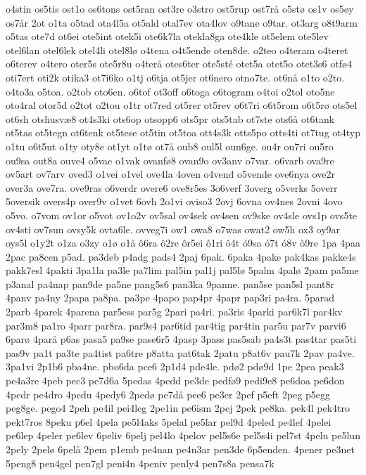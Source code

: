 {o4stin
os5tis
ost1o
os6tons
ost5ran
ost3re
o3stro
ost5rup
ost7rå
o5stø
os1v
os5øy
os7år
2ot
o1ta
o5tad
ota4l5a
ot5ald
otal7ev
ota4lov
o9tane
o9tar.
ot3arg
o8t9arm
o5tas
ote7d
ot6ei
ote5int
otek5i
ote6k7la
otekla8ga
ote4kle
ot5elem
ote5lev
otel6lan
otel6lek
otel4li
otel8lø
o4tena
o4t5ende
oten8de.
o2teo
o4teram
o4teret
o6terev
o4tero
oter5s
ote5r8u
o4terå
otes6ter
ote5sté
otet5a
otet5o
otet3s6
otfø4
oti7ert
oti2k
otika3
ot7i6ko
o1tj
o6tja
ot5jer
ot6nero
otno7te.
ot6nå
o1to
o2to.
o4to3a
o5toa.
o2tob
oto6en.
o6tof
ot3off
o6toga
o6togram
o4toi
o2tol
oto5ne
oto4ral
otor5d
o2tot
o2tou
o1tr
ot7red
ot5rer
ot5rev
o6t7ri
o6t5rom
o6t5rø
ots5el
ot6sh
otshusvæ8
ot4s3ki
ots6op
otsopp6
ots5pr
ots5tab
ot7ste
ots6å
ot6tank
ot5tas
ot5tegn
ot6tenk
ot5tese
ot5tin
ot5toa
ott4s3k
otts5po
otts4ti
ot7tug
ot4typ
o1tu
o6t5ut
o1ty
oty8e
ot1yt
o1tø
ot7å
oub8
oul5l
oun6ge.
ou4r
ou7ri
ou5ro
ou9sa
out8a
ouve4
o5vae
o1vak
ovanfø8
ovan9o
ov3anv
o7var.
o6varb
ova9re
ov5art
ov7arv
oved3
o1vei
o1vel
ove4la
4oven
o4vend
o5vende
ove6nya
ove2r
over3a
ove7ra.
ove9ras
o6verdr
overe6
ove8r5es
3o6verf
3overg
o5verks
5overr
5oversik
overs4p
over9v
o1vet
6ovh
2o1vi
oviso3
2ovj
6ovna
ov4nes
2ovni
4ovo
o5vo.
o7vom
ov1or
o5vot
ov1o2v
ov5sal
ov4sek
ov4sen
ov9ske
ov4sle
ovs1p
ovs5te
ov4sti
ov7sun
ovsy5k
ovta6le.
ovveg7i
ow1
owa8
o7was
owat2
ow5h
ox3
oy9ar
oys5l
o1y2t
o1za
o3zy
o1ø
o1å
ô6ra
ô2re
ôr5ei
ô1ri
ô4t
ó9sa
ó7t
ó8v
ò9re
1pa
4paa
2pac
pa8cen
p5ad.
pa3deb
p4adg
pads4
2paj
6pak.
6paka
4pake
pak4kas
pakke4s
pakk7esl
4pakti
3pa1la
pa3le
pa7lim
pal5in
pal1j
pal5lø
5palm
4palø
2pam
pa5me
p3anal
pa4nap
pan9de
pa5ne
pang5s6
pan3ka
9panne.
pan5se
pan5sl
pant8r
4panv
pa4ny
2papa
pa8pa.
pa3pe
4papo
pap4pr
4papr
pap3ri
pa4ra.
5parad
2parb
4parek
4parena
par5ess
par5g
2pari
pa4ri.
pa3ris
4parki
par6k7l
par4kv
par3m8
pa1ro
4parr
par8ra.
par9s4
par6tid
par4tig
par4tin
par5u
par7v
parvi6
6parø
4parå
p6as
pasa5
pa9se
pase6r5
4pasp
3pass
pas5sab
pa4s3t
pas4tar
pas5ti
pas9v
pa1t
pa3te
pa4tist
pa6tre
p8atta
pat6tak
2patu
p8at6v
pau7k
2pav
pa4ve.
3pa1vi
2p1b6
pba4ne.
pbo6da
pce6
2p1d4
pde4le.
pdø2
pdø9d
1pe
2pea
peak3
pe4a3re
4peb
pec3
pe7d6a
5pedas
4pedd
pe3de
pedfø9
pedi9e8
pe6doa
pe6don
4pedr
pe4dro
4pedu
4pedy6
2pedø
pe7då
pee6
pe3er
2pef
p5eft
2peg
p5egg
peg8ge.
pego4
2peh
pe4il
pei4leg
2pe1in
pe6ism
2pej
2pek
pe8ka.
pek4l
pek4tro
pekt7ros
8peku
p6el
4pela
pe5l4aks
5pelal
pe5lar
pel9d
4peled
pe4lef
4pelei
pe6lep
4peler
pe6lev
6peliv
6pelj
pel4lo
4pelov
pel5s6e
pel5s4i
pel7st
4pelu
pe5lun
2pely
2pelø
6pelå
2pem
p1emb
pe4nan
pe4n3ar
pen3de
6p5enden.
4pener
pe3net
5peng8
pen4gel
pen7gl
peni4n
4peniv
penly4
pen7s8a
pensa7k
}
